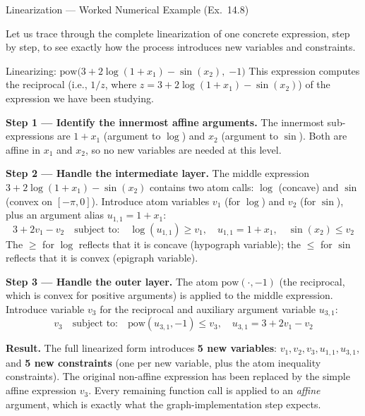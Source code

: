 \documentclass[aspectratio=169,10pt]{beamer}
\begin{document}
\begin{frame}[allowframebreaks]{Linearization --- Worked Numerical Example (Ex.\ 14.8)}

  Let us trace through the complete linearization of one concrete
  expression, step by step, to see exactly how the process introduces
  new variables and constraints.

  \begin{exampleblock}{Linearizing: $\mathrm{pow}\!\bigl(3 + 2\log(1+x_1) - \sin(x_2),\;{-1}\bigr)$}
    This expression computes the reciprocal (i.e., $1/z$, where
    $z = 3 + 2\log(1+x_1) - \sin(x_2)$) of the expression we
    have been studying.

    \medskip
    \textbf{Step 1 --- Identify the innermost affine arguments.}
    The innermost sub-expressions are $1 + x_1$ (argument to $\log$)
    and $x_2$ (argument to $\sin$).  Both are affine in $x_1$ and
    $x_2$, so no new variables are needed at this level.

    \medskip
    \textbf{Step 2 --- Handle the intermediate layer.}  The middle
    expression $3 + 2\log(1+x_1) - \sin(x_2)$ contains two atom
    calls: $\log$ (concave) and $\sin$ (convex on $[-\pi, 0]$).
    Introduce atom variables $v_1$ (for $\log$) and $v_2$ (for
    $\sin$), plus an argument alias $u_{1,1} = 1 + x_1$:
    \[
      3 + 2v_1 - v_2 \quad\text{subject to:}\quad
      \log(u_{1,1}) \geq v_1,\quad u_{1,1} = 1+x_1,\quad
      \sin(x_2) \leq v_2
    \]
    The $\geq$ for $\log$ reflects that it is concave (hypograph
    variable); the $\leq$ for $\sin$ reflects that it is convex
    (epigraph variable).

    \medskip
    \textbf{Step 3 --- Handle the outer layer.}  The atom
    $\mathrm{pow}(\cdot, -1)$ (the reciprocal, which is convex for
    positive arguments) is applied to the middle expression.  Introduce
    variable $v_3$ for the reciprocal and auxiliary argument variable
    $u_{3,1}$:
    \[
      v_3 \quad\text{subject to:}\quad
      \mathrm{pow}(u_{3,1}, -1) \leq v_3,\quad
      u_{3,1} = 3 + 2v_1 - v_2
    \]

    \medskip
    \textbf{Result.}  The full linearized form introduces
    \textbf{5 new variables}: $v_1, v_2, v_3, u_{1,1}, u_{3,1}$,
    and \textbf{5 new constraints} (one per new variable, plus the
    atom inequality constraints).  The original non-affine expression
    has been replaced by the simple affine expression $v_3$.  Every
    remaining function call is applied to an \emph{affine} argument,
    which is exactly what the graph-implementation step expects.
  \end{exampleblock}

\end{frame}
\end{document}
